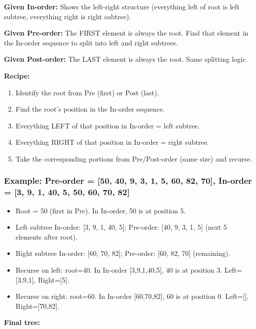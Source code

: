 \documentclass[12pt,portrait]{article}
\begin{document}
\begin{rulebox}
\textbf{Given In-order:} Shows the left-right structure (everything left of root is left subtree, everything right is right subtree).

\textbf{Given Pre-order:} The FIRST element is always the root. Find that element in the In-order sequence to split into left and right subtrees.

\textbf{Given Post-order:} The LAST element is always the root. Same splitting logic.

\textbf{Recipe:}
\begin{enumerate}[leftmargin=*]
    \item Identify the root from Pre (first) or Post (last).
    \item Find the root's position in the In-order sequence.
    \item Everything LEFT of that position in In-order = left subtree.
    \item Everything RIGHT of that position in In-order = right subtree.
    \item Take the corresponding portions from Pre/Post-order (same size) and recurse.
\end{enumerate}
\end{rulebox}

\subsubsection{Example: Pre-order = [50, 40, 9, 3, 1, 5, 60, 82, 70], In-order = [3, 9, 1, 40, 5, 50, 60, 70, 82]}

\begin{itemize}[leftmargin=*]
    \item Root = 50 (first in Pre). In In-order, 50 is at position 5.
    \item Left subtree In-order: [3, 9, 1, 40, 5]; Pre-order: [40, 9, 3, 1, 5] (next 5 elements after root).
    \item Right subtree In-order: [60, 70, 82]; Pre-order: [60, 82, 70] (remaining).
    \item Recurse on left: root=40. In In-order [3,9,1,40,5], 40 is at position 3. Left=[3,9,1], Right=[5].
    \item Recurse on right: root=60. In In-order [60,70,82], 60 is at position 0. Left=[], Right=[70,82].
\end{itemize}

\textbf{Final tree:}
\begin{center}
\end{center}
\end{document}
